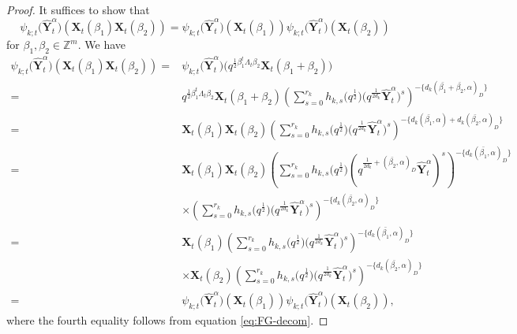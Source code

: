  \begin{proof}
It suffices to show that
 \[\psi_{k;t}\bigl(\mathbf{\hat{Y}}_{t}^{\alpha}\bigr)(\mathbf{X}_{t}(\beta_1)\mathbf{X}_{t}(\beta_2))=\psi_{k;t}\bigl(\mathbf{\hat{Y}}_{t}^{\alpha}\bigr)(\mathbf{X}_{t}(\beta_1))\psi_{k;t}\bigl(\mathbf{\hat{Y}}_{t}^{\alpha}\bigr)(\mathbf{X}_{t}(\beta_2))\]
for $\beta_{1},\beta_2\in\mathbb{Z}^{m}$. We have
\begin{align*}
 \psi_{k;t}\bigl(\mathbf{\hat{Y}}_{t}^{\alpha}\bigr)(\mathbf{X}_{t}(\beta_1)\mathbf{X}_{t}(\beta_2))
 ={}&\psi_{k;t}\bigl(\mathbf{\hat{Y}}_{t}^{\alpha}\bigr)\bigl(q^{\frac{1}{2}\beta_{1}^{t}\Lambda_{t}\beta_{2}}\mathbf{X}_{t}(\beta_1+\beta_2)\bigr)\\
 ={}&q^{\frac{1}{2}\beta_{1}^{t}\Lambda_{t}\beta_{2}}\mathbf{X}_{t}(\beta_{1}+\beta_{2})\left(\sum\limits_{s=0}^{r_k} h_{k,s}\bigl(q^{\frac{1}{2}}\bigr)\bigl(q^{\frac{1}{2d_{k}}}\mathbf{\hat{Y}}_{t}^{\alpha}\bigr)^{s}\right)^{-\{d_{k}(\bar{\beta_{1}}+\bar{\beta_{2}},\alpha)_D\}}\\
 ={}&\mathbf{X}_{t}(\beta_{1})\mathbf{X}_{t}(\beta_{2})\left(\sum\limits_{s=0}^{r_k} h_{k,s}\bigl(q^{\frac{1}{2}}\bigr)\bigl(q^{\frac{1}{2d_{k}}}\mathbf{\hat{Y}}_{t}^{\alpha}\bigr)^{s}\right)^{-\{d_{k}(\bar{\beta_{1}},\alpha)+d_k(\bar{\beta_{2}},\alpha)_D\}}\\
={}&\mathbf{X}_{t}(\beta_{1})\mathbf{X}_{t}(\beta_{2})\left(\sum\limits_{s=0}^{r_k} h_{k,s}\bigl(q^{\frac{1}{2}}\bigr)(q^{\frac{1}{2d_{k}}+ (\bar{\beta_{2}},\alpha)_D}\mathbf{\hat{Y}}_{t}^{\alpha})^{s}\right)^{-\{d_{k}(\bar{\beta_{1}},\alpha)_D\}}\\
&\times\left(\sum\limits_{s=0}^{r_k} h_{k,s}\bigl(q^{\frac{1}{2}}\bigr)\bigl(q^{\frac{1}{2d_{k}}}\mathbf{\hat{Y}}_{t}^{\alpha}\bigr)^{s}\right)^{-\{d_{k}(\bar{\beta_{2}},\alpha)_D\}}\\
={}&\mathbf{X}_{t}(\beta_{1})\left(\sum\limits_{s=0}^{r_k} h_{k,s}\bigl(q^{\frac{1}{2}}\bigr)\bigl(q^{\frac{1}{2d_{k}}}\mathbf{\hat{Y}}_{t}^{\alpha}\bigr)^{s}\right)^{-\{d_{k}(\bar{\beta_{1}},\alpha)_D\}}\\
&\times\mathbf{X}_{t}(\beta_{2})\left(\sum\limits_{s=0}^{r_k} h_{k,s}\bigl(q^{\frac{1}{2}}\bigr)\bigl(q^{\frac{1}{2d_{k}}}\mathbf{\hat{Y}}_{t}^{\alpha}\bigr)^{s}\right)^{-\{d_{k}(\bar{\beta_{2}},\alpha)_D\}}\\
={}&\psi_{k;t}\bigl(\mathbf{\hat{Y}}_{t}^{\alpha}\bigr)(\mathbf{X}_{t}(\beta_1))\psi_{k;t}\bigl(\mathbf{\hat{Y}}_{t}^{\alpha}\bigr)(\mathbf{X}_{t}(\beta_2)),
\end{align*}
where the fourth equality follows from equation \eqref{eq:FG-decom}.
\end{proof}

